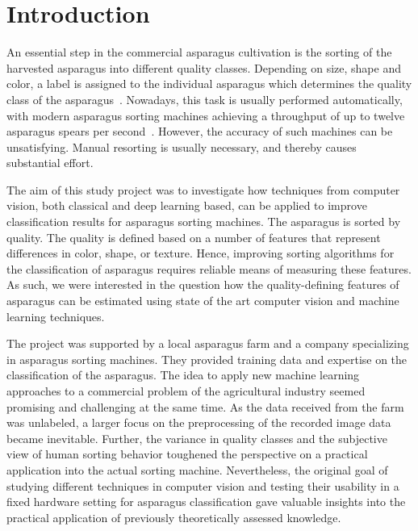 \section{Introduction}
\label{ch:Introduction}

An essential step in the commercial asparagus cultivation is the sorting of the harvested asparagus into different quality classes. Depending on size, shape and color, a label is assigned to the individual asparagus which determines the quality class of the asparagus~\citep{unspargelnorm}. Nowadays, this task is usually performed automatically, with modern asparagus sorting machines achieving a throughput of up to twelve asparagus spears per second~\citep{ting2015zeitalter}. However, the accuracy of such machines can be unsatisfying. Manual resorting is usually necessary, and thereby causes substantial effort.

\bigskip
The aim of this study project was to investigate how techniques from computer vision, both classical and deep learning based, can be applied to improve classification results for asparagus sorting machines. The asparagus is sorted by quality. The quality is defined based on a number of features that represent differences in color, shape, or texture. Hence, improving sorting algorithms for the classification of asparagus requires reliable means of measuring these features. As such, we were interested in the question how the quality-defining features of asparagus can be estimated using state of the art computer vision and machine learning techniques.

The project was supported by a local asparagus farm and a company specializing in asparagus sorting machines. They provided training data and expertise on the classification of the asparagus. The idea to apply new machine learning approaches to a commercial problem of the agricultural industry seemed promising and challenging at the same time. As the data received from the farm was unlabeled, a larger focus on the preprocessing of the recorded image data became inevitable. Further, the variance in quality classes and the subjective view of human sorting behavior toughened the perspective on a practical application into the actual sorting machine. Nevertheless, the original goal of studying different techniques in computer vision and testing their usability in a fixed hardware setting for asparagus classification gave valuable insights into the practical application of previously theoretically assessed knowledge.

